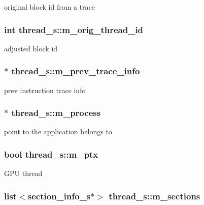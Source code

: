 original block id from a trace \hypertarget{structthread__s_a7557fcd4c6c92363d3345c65dc3a4603}{
\subsubsection[{m\_\-orig\_\-thread\_\-id}]{\setlength{\rightskip}{0pt plus 5cm}int {\bf thread\_\-s::m\_\-orig\_\-thread\_\-id}}}
\label{structthread__s_a7557fcd4c6c92363d3345c65dc3a4603}
adjusted block id \hypertarget{structthread__s_a978fea511dd7c2d9076e06d81a675b9f}{
\subsubsection[{m\_\-prev\_\-trace\_\-info}]{$\ast$ {\bf thread\_\-s::m\_\-prev\_\-trace\_\-info}}}
\label{structthread__s_a978fea511dd7c2d9076e06d81a675b9f}
prev instruction trace info \hypertarget{structthread__s_ab3d94c455b77f0cc2f14151f8574c153}{
\subsubsection[{m\_\-process}]{$\ast$ {\bf thread\_\-s::m\_\-process}}}
\label{structthread__s_ab3d94c455b77f0cc2f14151f8574c153}
point to the application belongs to \hypertarget{structthread__s_a12ca032501e4c819e864f4118781aa66}{
\subsubsection[{m\_\-ptx}]{\setlength{\rightskip}{0pt plus 5cm}bool {\bf thread\_\-s::m\_\-ptx}}}
\label{structthread__s_a12ca032501e4c819e864f4118781aa66}
GPU thread \hypertarget{structthread__s_acbb56db74b9ba52acb14437d6f9e0231}{
\subsubsection[{m\_\-sections}]{\setlength{\rightskip}{0pt plus 5cm}list$<${\bf section\_\-info\_\-s}$\ast$$>$ {\bf thread\_\-s::m\_\-sections}}}
